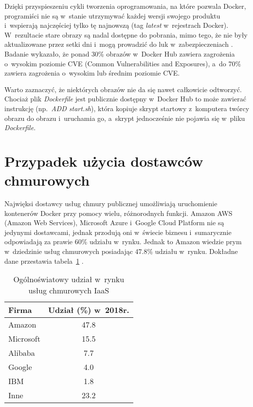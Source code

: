 Dzięki przyspieszeniu cykli tworzenia oprogramowania, na które pozwala Docker, programiści nie są w~stanie utrzymywać każdej wersji swojego produktu i~wspierają najczęściej tylko tę najnowszą (tag \textit{latest} w~rejestrach Docker). W~rezultacie stare obrazy są nadal dostępne do pobrania, mimo tego, że nie były aktualizowane przez setki dni i~mogą prowadzić do luk w~zabezpieczeniach \cite{ShuStudyOfSecurityVulnerabilitiesOnDockerHub}. Badanie \cite{BanyanDockerHubHighPrioritySecurityVulnerabilities} wykazało, że ponad 30\% obrazów w~Docker Hub zawiera zagrożenia o~wysokim poziomie CVE (Common Vulnerabilities and Exposures), a~do 70\% zawiera zagrożenia o~wysokim lub średnim poziomie CVE.

Warto zaznaczyć, że niektórych obrazów nie da się nawet całkowicie odtworzyć. Chociaż plik \textit{Dockerfile} jest publicznie dostępny w~Docker Hub to może zawierać instrukcję (np.~\textit{ADD start.sh}), która kopiuje skrypt startowy z~komputera twórcy obrazu do obrazu i~uruchamia go, a~skrypt jednocześnie nie pojawia się w~pliku \textit{Dockerfile}.

\section{Przypadek użycia dostawców chmurowych}

Najwięksi dostawcy usług chmury publicznej umożliwiają uruchomienie kontenerów Docker przy pomocy wielu, różnorodnych funkcji. Amazon AWS (Amazon Web Services), Microsoft Azure i~Google Cloud Platform nie są jedynymi dostawcami, jednak przodują oni w~świecie biznesu i~sumarycznie odpowiadają za prawie 60\% udziału w~rynku. Jednak to Amazon wiedzie prym w~dziedzinie usług chmurowych posiadając 47.8\% udziału w~rynku. Dokładne dane przestawia tabela~\ref{table:cloudProviders} \cite{GartnerPublicCloudServices}. 

\begin{table}[ht]
    \centering
    \begin{tabular}{|l|c|}
        \hline
        \textbf{Firma} & \textbf{Udział (\%) w~2018r.} \\
        \hline
        Amazon & 47.8 \\
        \hline
        Microsoft & 15.5 \\
        \hline
        Alibaba & 7.7 \\
        \hline
        Google & 4.0 \\
        \hline
        IBM & 1.8 \\
        \hline
        Inne & 23.2 \\
        \hline
    \end{tabular}
    \caption{Ogólnoświatowy udział w~rynku usług chmurowych IaaS \cite{GartnerPublicCloudServices}}
    \label{table:cloudProviders}
\end{table}

